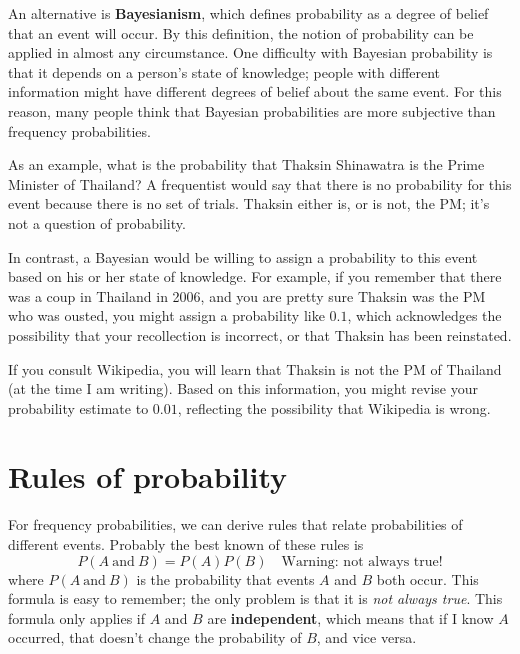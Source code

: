 \documentclass[12pt]{book}
\begin{document}
An alternative is {\bf Bayesianism}, which defines probability as
a degree of belief that an event will occur.  By this definition,
the notion of probability can be applied in almost any circumstance.
One difficulty with Bayesian probability is that it depends on
a person's state of knowledge; people with different information
might have different degrees of belief about the same event.  For
this reason, many people think that Bayesian probabilities are
more subjective than frequency probabilities.


As an example, what is the probability that Thaksin Shinawatra is the
Prime Minister of Thailand?  A frequentist would say that there is no
probability for this event because there is no set of
trials.  Thaksin either is, or is not, the PM; it's not a question of
probability.

In contrast, a Bayesian would be willing to assign a probability to
this event based on his or her state of knowledge.  For example, if
you remember that there was a coup in Thailand in 2006, and you are
pretty sure Thaksin was the PM who was ousted, you might
assign a probability like $0.1$, which acknowledges the possibility
that your recollection is incorrect, or that Thaksin has been
reinstated.

If you consult Wikipedia, you will learn that Thaksin is not the
PM of Thailand (at the time I am writing).  Based on this
information, you might revise your probability estimate to $0.01$,
reflecting the possibility that Wikipedia is wrong.


\section{Rules of probability}

\newcommand{\AND}{~\mbox{and}~}

For frequency probabilities, we can derive rules that relate
probabilities of different events.  Probably the best known of these
rules is
%
\[ P(A \AND B) = P(A) P(B) \quad \mbox{Warning: not always true!}\]
%
where $P(A \AND B)$ is the probability that events $A$ and $B$ both
occur.  This formula is easy to remember; the only problem is that it
is {\em not always true}.  This formula only applies if $A$ and $B$
are {\bf independent}, which means that if I know $A$ occurred, that
doesn't change the probability of $B$, and vice versa.
\end{document}
